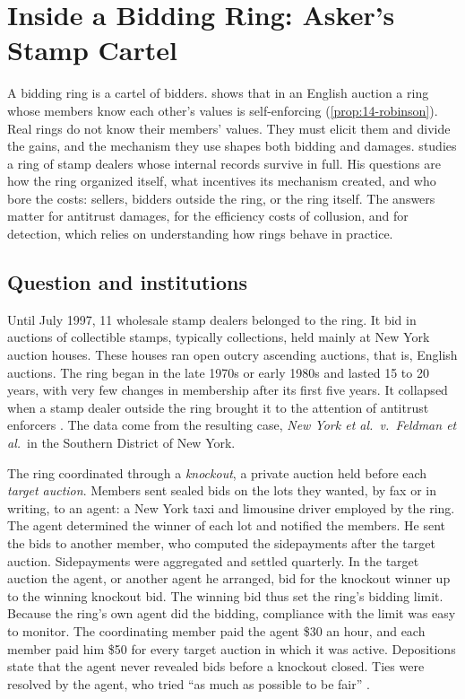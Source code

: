 \section{Inside a Bidding Ring: Asker's Stamp Cartel}\label{sec:13-asker}

A bidding ring is a cartel of bidders.  shows that in an English auction a ring
whose members know each other's values is self-enforcing (\cref{prop:14-robinson}). Real rings do not know
their members' values. They must elicit them and divide the gains, and the mechanism they use shapes both
bidding and damages. \citet{Asker2010} studies a ring of stamp dealers whose internal records survive in full.
His questions are how the ring organized itself, what incentives its mechanism created, and who bore the costs:
sellers, bidders outside the ring, or the ring itself. The answers matter for antitrust damages, for the
efficiency costs of collusion, and for detection, which relies on understanding how rings behave in practice.

\subsection{Question and institutions}\label{sec:13-asker-institutions}

Until July 1997, 11 wholesale stamp dealers belonged to the ring. It bid in auctions of collectible stamps,
typically collections, held mainly at New York auction houses. These houses ran open outcry ascending
auctions, that is, English auctions. The ring began in the late 1970s or early 1980s and lasted 15 to 20 years,
with very few changes in membership after its first five years. It collapsed when a stamp dealer outside the
ring brought it to the attention of antitrust enforcers \citep[p.~725]{Asker2010}. The data come from the
resulting case, \textit{New York et al.\ v.\ Feldman et al.}\ in the Southern District of New York.

The ring coordinated through a \emph{knockout}, a private auction held before each \emph{target auction}.
Members sent sealed bids on the lots they wanted, by fax or in writing, to an agent: a New York taxi and
limousine driver employed by the ring. The agent determined the winner of each lot and notified the members.
He sent the bids to another member, who computed the sidepayments after the target auction. Sidepayments were
aggregated and settled quarterly. In the target
auction the agent, or another agent he arranged, bid for the knockout winner up to the winning knockout bid.
The winning bid thus set the ring's bidding limit. Because the ring's own agent did the bidding, compliance
with the limit was easy to monitor. The coordinating member paid the agent \$30 an hour, and each member paid
him \$50 for every target auction in which it was active. Depositions state that the agent never revealed bids
before a knockout closed. Ties were resolved by the agent, who tried ``as much as possible to be fair''
\citep[pp.~727--728]{Asker2010}.

